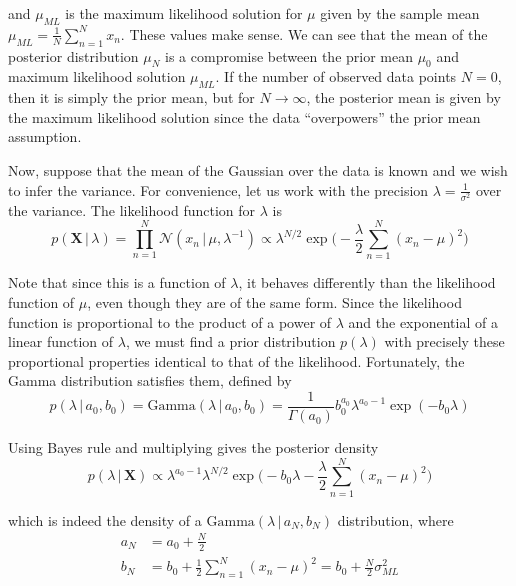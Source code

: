 \documentclass{article}
\begin{document}
    and $\mu_{ML}$ is the maximum likelihood solution for $\mu$ given by the sample mean $\mu_{ML} = \frac{1}{N} \sum_{n=1}^N x_n$. These values make sense. We can see that the mean of the posterior distribution $\mu_N$ is a compromise between the prior mean $\mu_0$ and maximum likelihood solution $\mu_{ML}$. If the number of observed data points $N=0$, then it is simply the prior mean, but for $N \rightarrow \infty$, the posterior mean is given by the maximum likelihood solution since the data ``overpowers'' the prior mean assumption.

    Now, suppose that the mean of the Gaussian over the data is known and we wish to infer the variance. For convenience, let us work with the precision $\lambda = \frac{1}{\sigma^2}$ over the variance. The likelihood function for $\lambda$ is
    \begin{equation}
      p(\mathbf{X}\,|\,\lambda) = \prod_{n=1}^N \mathcal{N} (x_n\,|\, \mu, \lambda^{-1}) \propto \lambda^{N/2} \exp \bigg(-\frac{\lambda}{2} \sum_{n=1}^N (x_n - \mu)^2 \bigg)
    \end{equation}

    Note that since this is a function of $\lambda$, it behaves differently than the likelihood function of $\mu$, even though they are of the same form. Since the likelihood function is proportional to the product of a power of $\lambda$ and the exponential of a linear function of $\lambda$, we must find a prior distribution $p(\lambda)$ with precisely these proportional properties identical to that of the likelihood. Fortunately, the Gamma distribution satisfies them, defined by
    \begin{equation}
      p(\lambda\,|\,a_0, b_0) = \text{Gamma}(\lambda\,|\, a_0, b_0) = \frac{1}{\Gamma(a_0)} b_0^{a_0} \lambda^{a_0-1} \exp(-b_0 \lambda)
    \end{equation}

    Using Bayes rule and multiplying gives the posterior density
    \begin{equation}
      p(\lambda\,|\,\mathbf{X}) \propto \lambda^{a_0 - 1} \lambda^{N/2} \exp\bigg( -b_0 \lambda - \frac{\lambda}{2} \sum_{n=1}^N (x_n - \mu)^2 \bigg)
    \end{equation}

    which is indeed the density of a $\text{Gamma}(\lambda\,|\,a_N, b_N)$ distribution, where
    \begin{align*}
      a_N & = a_0 + \frac{N}{2} \\
      b_N & = b_0 + \frac{1}{2} \sum_{n=1}^N (x_n - \mu)^2 = b_0 + \frac{N}{2} \sigma_{ML}^2
    \end{align*}
\end{document}
